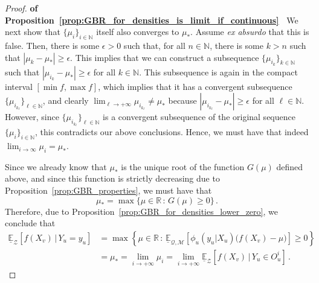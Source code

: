 \documentclass[twoside,11pt]{article}
\newcommand{\nats}{\mathbb{N}}
\newcommand{\reals}{\mathbb{R}}
\newcommand{\lexp}{\underline{\mathbb{E}}_{\rateset,\mathcal{M}}}
\newcommand{\rateset}{\mathcal{Q}}
\newcommand{\abs}[1]{\left\vert #1 \right\vert}
\begin{document}
\begin{proof}{\bf of Proposition~\ref{prop:GBR_for_densities_is_limit_if_continuous}~}
We next show that $\{\mu_i\}_{i\in\nats}$ itself also converges to $\mu_*$. Assume \emph{ex absurdo} that this is false. Then, there is some $\epsilon>0$ such that, for all $n\in\nats$, there is some $k>n$ such that $\abs{\mu_k - \mu_*} \geq \epsilon$. This implies that we can construct a subsequence $\{\mu_{i_k}\}_{k\in\nats}$ such that $\abs{\mu_{i_k}-\mu_*}\geq \epsilon$ for all $k\in\nats$. This subsequence is again in the compact interval $[\min f, \max f]$, which implies that it has a convergent subsequence $\{\mu_{i_{k_\ell}}\}_{\ell\in\nats}$, and clearly $\lim_{\ell\to+\infty}\mu_{i_{k_\ell}} \neq \mu_*$ because $\abs{\mu_{i_{k_\ell}} - \mu_*}\geq\epsilon$ for all $\ell\in\nats$. However, since $\{\mu_{i_{k_\ell}}\}_{\ell\in\nats}$ is a convergent subsequence of the original sequence $\{\mu_i\}_{i\in\nats}$, this contradicts our above conclusions. Hence, we must have that indeed $\lim_{i\to\infty}\mu_i=\mu_*$.

Since we already know that $\mu_*$ is the unique root of the function $G(\mu)$ defined above, and since this function is strictly decreasing due to Proposition~\ref{prop:GBR_properties}, we must have that
\begin{equation*}
\mu_* = \max\{\mu\in\reals\,:\, G(\mu)\geq 0\}\,.
\end{equation*}
Therefore, due to Proposition~\ref{prop:GBR_for_densities_lower_zero}, we conclude that
\begin{align*}
\underline{\mathbb{E}}_\mathcal{Z}[f(X_v)\,\vert\,Y_u=y_u] &= \max\left\{\mu\in\reals\,:\, \lexp\left[\phi_u(y_u\vert X_u)\bigl(f(X_v) - \mu\bigr)\right] \geq 0\right\} \\
 &= \mu_* = \lim_{i\to+\infty} \mu_i 
 = \lim_{i\to+\infty} \underline{\mathbb{E}}_\mathcal{Z}[f(X_v)\,\vert\,Y_u\in O_u^i]\,.
\end{align*}
\end{proof}
\end{document}
